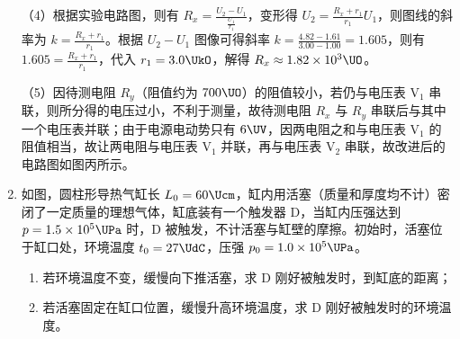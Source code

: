 \documentclass[\gkver]{gaokaozhenti}
\begin{document}
\begin{enumerate}
{（4）根据实验电路图，则有 $R_{x}=\frac{U_{2}-U_{1}}{\frac{U_{1}}{r_{1}}}$，变形得 $U_{2}=\frac{R_{x}+r_{1}}{r_{1}}U_{1}$，则图线的斜率为 $k=\frac{R_{x}+r_{1}}{r_{1}}$。根据 $U_{2}-U_{1}$ 图像可得斜率 $k=\frac{4.82-1.61}{3.00-1.00}=1.605$，则有 $1.605=\frac{R_{x}+r_{1}}{r_{1}}$，代入 $r_{1}=3.0\UkO$，解得 $R_{x}\approx1.82\times10^{3}\UO$。

（5）因待测电阻 $R_{y}$（阻值约为 $700\UO$）的阻值较小，若仍与电压表 V$_{1}$ 串联，则所分得的电压过小，不利于测量，故待测电阻 $R_{x}$ 与 $R_{y}$ 串联后与其中一个电压表并联；由于电源电动势只有 $6\UV$，因两电阻之和与电压表 V$_{1}$ 的阻值相当，故让两电阻与电压表 V$_{1}$ 并联，再与电压表 V$_{2}$ 串联，故改进后的电路图如图丙所示。

}

\item
如图，圆柱形导热气缸长 $L_{0}=60\Ucm$，缸内用活塞（质量和厚度均不计）密闭了一定质量的理想气体，缸底装有一个触发器 D，当缸内压强达到 $p=1.5\times10^{5}\UPa$ 时，D 被触发，不计活塞与缸壁的摩擦。初始时，活塞位于缸口处，环境温度 $t_{0}=27\UdC$，压强 $p_{0}=1.0\times10^{5}\UPa$。
\begin{enumerate}
	\item
	若环境温度不变，缓慢向下推活塞，求 D 刚好被触发时，到缸底的距离；
	\item
	若活塞固定在缸口位置，缓慢升高环境温度，求 D 刚好被触发时的环境温度。
\end{enumerate}
\jdanswer{
\begin{enumerate}
	\item
	$0.4\Um$
	\item
	$450\UK$
\end{enumerate}
}


\end{enumerate}
\end{document}
